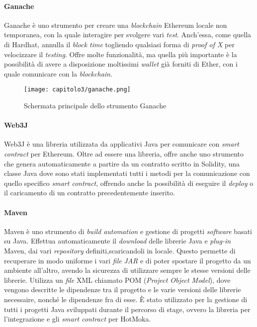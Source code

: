 \paragraph{Ganache}
Ganache è uno strumento per creare una \textit{blockchain} Ethereum locale non temporanea, con la quale interagire per svolgere vari \textit{test}. Anch'essa, come quella di Hardhat, annulla il \textit{block time} togliendo qualsiasi forma di \textit{proof of X} per velocizzare il \textit{testing}. Offre molte funzionalità, ma quella più importante è la possibilità di avere a disposizione moltissimi \textit{wallet} già forniti di Ether, con i quale comunicare con la \textit{blockchain}.

\clearpage
\begin{figure}[h!]
  \centering
  \texttt{[image: capitolo3/ganache.png]}
  \caption{Schermata principale dello strumento Ganache}
\end{figure}

\paragraph{Web3J} 
Web3J è una libreria utilizzata da applicativi Java per comunicare con \textit{smart contract} per Ethereum.
Oltre ad essere una libreria, offre anche uno strumento che genera automaticamente a partire da un contratto scritto in Solidity, una classe Java dove sono stati implementati tutti i metodi per la comunicazione con quello specifico \textit{smart contract}, offrendo anche la possibilità di eseguire il \textit{deploy} o il caricamento di un contratto precedentemente inserito. 

\paragraph{Maven}
Maven è uno strumento di \textit{build automation} e gestione di progetti \textit{software} basati su Java. Effettua automaticamente il \textit{download} delle librerie Java e \textit{plug-in} Maven, dai vari \textit{repository} definiti,scaricandoli in locale. Questo permette di recuperare in modo uniforme i vari \textit{file} \textit{JAR} e di poter spostare il progetto da un ambiente all'altro, avendo la sicurezza di utilizzare sempre le stesse versioni delle librerie. Utilizza un \textit{file} XML chiamato POM (\textit{Project Object Model}), dove vengono descritte le dipendenze tra il progetto e le varie versioni delle librerie necessaire, nonché le dipendenze fra di esse. È stato utilizzato per la gestione di tutti i progetti Java sviluppati durante il percorso di stage, ovvero la libreria per l'integrazione e gli \textit{smart contract} per HotMoka.

